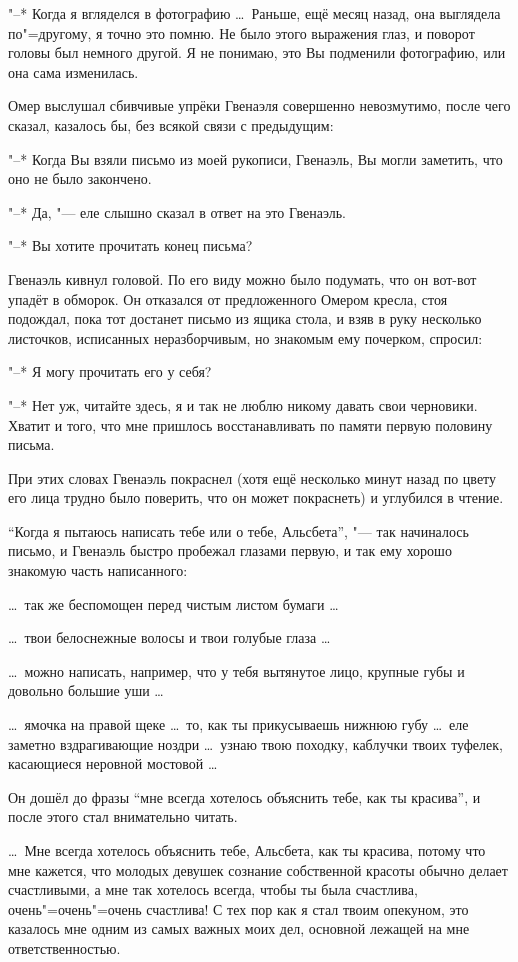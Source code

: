 "--* Когда я вгляделся в фотографию \ldots\
Раньше, ещё месяц назад, она выглядела по"=другому, я точно это помню.
Не было этого выражения глаз, и поворот головы был немного другой.
Я не понимаю, это Вы подменили фотографию, или она сама изменилась.

Омер выслушал сбивчивые упрёки Гвенаэля совершенно невозмутимо, после чего
сказал, казалось бы, без всякой связи с предыдущим:

"--* Когда Вы взяли письмо из моей рукописи, Гвенаэль, Вы могли заметить, что
оно не было закончено.

"--* Да, "--- еле слышно сказал в ответ на это Гвенаэль.

"--* Вы хотите прочитать конец письма?

Гвенаэль кивнул головой.
По его виду можно было подумать, что он вот-вот упадёт в обморок.
Он отказался от предложенного Омером кресла, стоя подождал, пока тот достанет
письмо из ящика стола, и взяв в руку несколько листочков, исписанных
неразборчивым, но знакомым ему почерком, спросил:

"--* Я могу прочитать его у себя?

"--* Нет уж, читайте здесь, я и так не люблю никому давать свои черновики.
Хватит и того, что мне пришлось восстанавливать по памяти первую половину письма.

При этих словах Гвенаэль покраснел (хотя ещё несколько минут назад по цвету его
лица трудно было поверить, что он может покраснеть) и углубился в чтение.

\enquote{Когда я пытаюсь написать тебе или о тебе, Альсбета}, "--- так начиналось
письмо, и Гвенаэль быстро пробежал глазами первую, и так ему хорошо знакомую
часть написанного:

\ldots\ так же беспомощен перед чистым листом бумаги \ldots

\ldots\ твои белоснежные волосы и твои голубые глаза \ldots

\ldots\ можно написать, например, что у тебя вытянутое лицо, крупные губы и
довольно большие уши \ldots

\ldots\ ямочка на правой щеке \ldots\ то, как ты прикусываешь нижнюю губу
\ldots\ еле заметно вздрагивающие ноздри \ldots\ узнаю твою походку, каблучки
твоих туфелек, касающиеся неровной мостовой \ldots

Он дошёл до фразы \enquote{мне всегда хотелось объяснить тебе, как ты красива},
и после этого стал внимательно читать.

\medskip
\ldots\ Мне всегда хотелось объяснить тебе, Альсбета, как ты красива, потому что
мне кажется, что молодых девушек сознание собственной красоты обычно делает
счастливыми, а мне так хотелось всегда, чтобы ты была счастлива,
очень"=очень"=очень счастлива!
С тех пор как я стал твоим опекуном, это казалось мне одним из самых важных моих
дел, основной лежащей на мне ответственностью.

